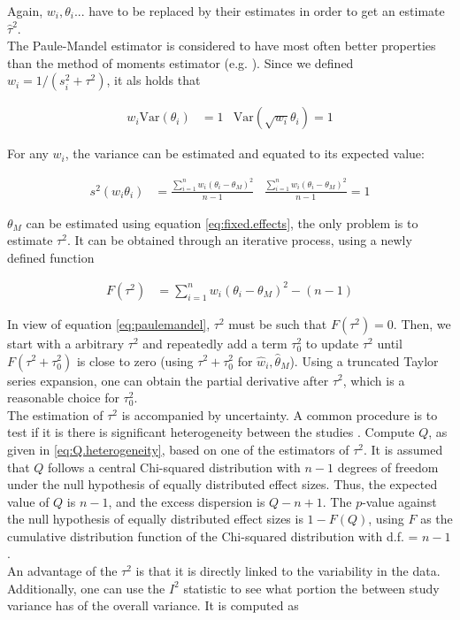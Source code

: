 \documentclass[11pt,a4paper,twoside]{book}\usepackage[]{graphicx}\usepackage[]{color}
\begin{document}
Again, $w_i, \theta_i ...$ have to be replaced by their estimates in order to get an estimate $\hat{\tau}^2$. \\
The Paule-Mandel estimator \citep{paulemandel} is considered to have most often better properties than the method of moments estimator (e.g. \citet{tau.estimator.evaluation}).
Since we defined $w_i = 1/(s_i^2 + \tau^2)$, it als holds that

\begin{align}
w_i \textrm{Var}(\theta_i) &= 1 & \textrm{Var}(\sqrt{w_i}\theta_i) = 1 \nonumber
\end{align}

For any $w_i$, the variance can be estimated and equated to its expected value:

\begin{align}
s^2(w_i\theta_i) &= \frac{\sum_{i = 1}^n w_i(\theta_i - \theta_M)^2}{n-1} & \frac{\sum_{i = 1}^n w_i(\theta_i - \theta_M)^2}{n-1} = 1 \label{eq:paulemandel}
\end{align}

$\theta_M$ can be estimated using equation \ref{eq:fixed.effects}, the only problem is to estimate $\tau^2$. It can be obtained through an iterative process, using a newly defined function

\begin{align}
F(\tau^2) &= \sum_{i = 1}^n w_i(\theta_i - \theta_M)^2 - (n-1) \nonumber
\end{align}

In view of equation \ref{eq:paulemandel}, $\tau^2$ must be such that $F(\tau^2) = 0$. Then, we start with a arbitrary $\tau^2$ and repeatedly add a term $\tau_0^2$ to update $\tau^2$ until $F(\tau^2 + \tau_0^2)$ is close to zero (using $\tau^2 + \tau_0^2$ for $\hat{w}_i, \hat{\theta}_M$). Using a truncated Taylor series expansion, one can obtain the partial derivative after $\tau^2$, which is a reasonable choice for $\tau_0^2$. \\
The estimation of $\tau^2$ is accompanied by uncertainty. A common procedure is to test if it is there is significant heterogeneity between the studies \cite[109]{Intro.meta}. Compute $Q$, as given in \ref{eq:Q.heterogeneity}, based on one of the estimators of $\tau^2$. It is assumed that $Q$ follows a central Chi-squared distribution with $n -1$ degrees of freedom under the null hypothesis of equally distributed effect sizes. Thus, the expected value of $Q$ is $n-1$, and the excess dispersion is $Q - n + 1$. The $p$-value against the null hypothesis of equally distributed effect sizes is $1 - F(Q)$, using $F$ as the cumulative distribution function of the Chi-squared distribution with d.f. = $n-1$. \\
An advantage of the $\tau^2$ is that it is directly linked to the variability in the data. Additionally, one can use the $I^2$ statistic to see what portion the between study variance has of the overall variance. It is computed as
\end{document}
